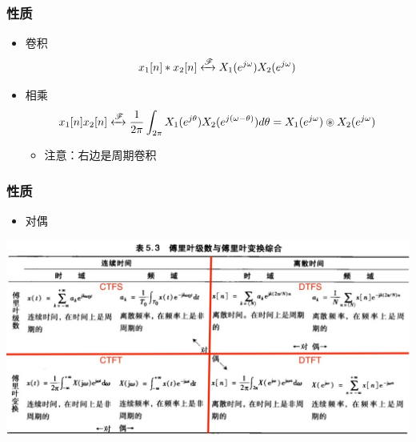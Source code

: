 \documentclass[CJKutf8,dvipsnames,table]{beamer}
\begin{document}
\begin{CJK*}{UTF8}{song}
  \begin{frame}
    \frametitle{性质}
    \begin{itemize}
    \item 卷积
    \[
    	x_1[n] \ast x_2[n] \xleftrightarrow{\mathscr{F}} X_1(e^{j\omega})X_2(e^{j\omega})
	\]    
    \item 相乘
    \[
    	x_1[n]x_2[n] \xleftrightarrow{\mathscr{F}} \frac{1}{2\pi}\int_{2\pi}X_1(e^{j\theta})X_2(e^{j(\omega-\theta)})d\theta = X_1(e^{j\omega}) \circledast X_2(e^{j\omega})
	\] 	
		\begin{itemize}
		\item 注意：右边是周期卷积
		\end{itemize}
	\end{itemize}
  \end{frame}   
	
  \begin{frame}
    \frametitle{性质}
    \begin{itemize}
    \item 对偶
    \end{itemize}
    \begin{center}
      \includegraphics[scale=.32]{ss-c-t5-3}
    \end{center}
  \end{frame}  
  	        

\end{CJK*}
\end{document}
